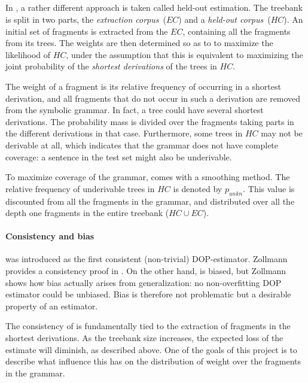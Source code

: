 \subsection{\dops}
In \dops{} \cite{zollmann2005}, a rather different approach is taken called held-out estimation. The treebank is split in two parts, the \emph{extraction corpus}~($EC$) and a \emph{held-out corpus}~($HC$). An initial set of fragments is extracted from the $EC$, containing all the fragments from its trees. The weights are then determined so as to to maximize the likelihood of $HC$, under the assumption that this is equivalent to maximizing the joint probability of the \emph{shortest derivations} of the trees in $HC$. 

The weight of a fragment is its relative frequency of occurring in a shortest derivation, and all fragments that do not occur in such a derivation are removed from the symbolic grammar. In fact, a tree could have several shortest derivations. The probability mass is divided over the fragments taking parts in the different derivations in that case. Furthermore, some trees in $HC$ may not be derivable at all, which indicates that the grammar does not have complete coverage: a sentence in the test set might also be underivable. 

To maximize coverage of the grammar, \dops{} comes with a smoothing method. The relative frequency of underivable trees in $HC$ is denoted by $p_{unkn}$. This value is discounted from all the fragments in the grammar, and distributed over all the depth one fragments in the entire treebank ($HC\cup EC$).


\paragraph{Consistency and bias}
\dops{} was introduced as the first consistent (non-trivial) DOP-estimator. Zollmann provides a consistency proof in \cite{zollmann2005}. On the other hand, \dops{} is  biased, but Zollmann shows how bias actually arises from generalization: no non-overfitting DOP estimator could be unbiased. Bias is therefore not problematic but a desirable property of an estimator.

The consistency of \dops{} is fundamentally tied to the extraction of fragments in the shortest derivations. As the treebank size increases, the expected loss of the estimate will diminish, as described above. One of the goals of this project is to describe what influence this has on the distribution of weight over the fragments in the grammar.

